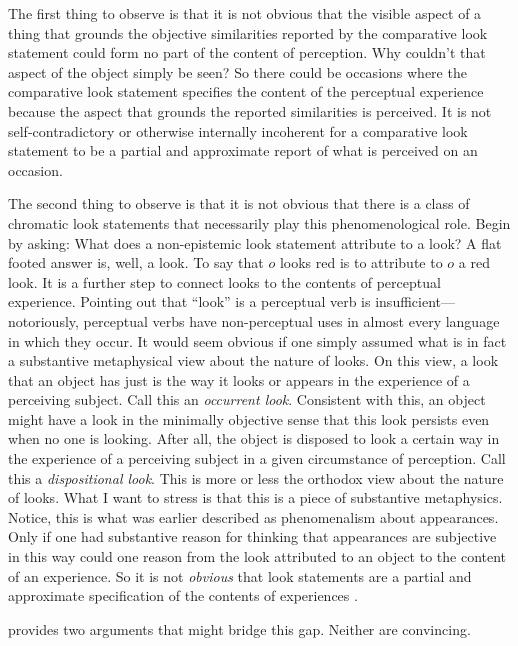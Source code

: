 \documentclass[12pt]{article}
\begin{document}
The first thing to observe is that it is not obvious that the visible aspect of a thing that grounds the objective similarities reported by the comparative look statement could form no part of the content of perception. Why couldn't that aspect of the object simply be seen? So there could be occasions where the comparative look statement specifies the content of the perceptual experience because the aspect that grounds the reported similarities is perceived. It is not self-contradictory or otherwise internally incoherent for a comparative look statement to be a partial and approximate report of what is perceived on an occasion.

The second thing to observe is that it is not obvious that there is a class of chromatic look statements that necessarily play this phenomenological role. Begin by asking: What does a non-epistemic look statement attribute to a look? A flat footed answer is, well, a look. To say that \( o \) looks red is to attribute to \( o \) a red look. It is a further step to connect looks to the contents of perceptual experience. Pointing out that ``look'' is a perceptual verb is insufficient---notoriously, perceptual verbs have non-perceptual uses in almost every language in which they occur. It would seem obvious if one simply assumed what is in fact a substantive metaphysical view about the nature of looks. On this view, a look that an object has just is the way it looks or appears in the experience of a perceiving subject. Call this an \emph{occurrent look}. Consistent with this, an object might have a look in the minimally objective sense that this look persists even when no one is looking. After all, the object is disposed to look a certain way in the experience of a perceiving subject in a given circumstance of perception. Call this a \emph{dispositional look}. This is more or less the orthodox view about the nature of looks. What I want to stress is that this is a piece of substantive metaphysics. Notice, this is what was earlier described as phenomenalism about appearances. Only if one had substantive reason for thinking that appearances are subjective in this way could one reason from the look attributed to an object to the content of an experience. So it is not \emph{obvious} that look statements are a partial and approximate specification of the contents of experiences \citep[for a defense of objective looks see][]{Brewer:2008fv,Martin:2008vn,Travis:2004kx}.

\citet{Jackson:1977fk} provides two arguments that might bridge this gap. Neither are convincing. 
\end{document}
